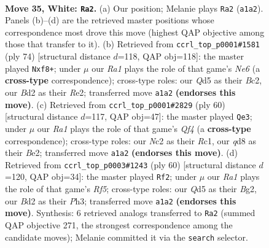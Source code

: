 \documentclass[11pt]{article}
\begin{document}
\clearpage

\begin{figure}[p]\centering
\begin{subfigure}{0.46\textwidth}\centering
\resizebox{\linewidth}{!}{%
\newchessgame
\chessboard[
  setfen={r2q1rk1/3n1p2/3p4/1PpQ3p/p5nP/P5P1/1bNB4/RN3RK1 w - - 0 35},
  showmover=false,
  pgfstyle=straightmove, color=movearrow, markmove={a1-a2}
]}
\caption{}
\end{subfigure}\hfill
\begin{subfigure}{0.46\textwidth}\centering
\resizebox{\linewidth}{!}{%
\newchessgame
\chessboard[
  setfen={4rr2/2p1n2k/1p2Nq1p/p2b1p1Q/P1p5/2P5/2B1R1PK/5R2 w - - 4 38},
  showmover=false,
  pgfstyle=straightmove, color=movearrow, markmove={e6-f8}
]}
\caption{}
\end{subfigure}
\\[4pt]
\begin{subfigure}{0.46\textwidth}\centering
\resizebox{\linewidth}{!}{%
\newchessgame
\chessboard[
  setfen={1qrr2k1/5pp1/2bppnn1/1p6/3RPQ2/P1N2N2/1P2BPP1/2R3K1 w - - 2 31},
  showmover=false,
  pgfstyle=straightmove, color=movearrow, markmove={f4-e3}
]}
\caption{}
\end{subfigure}\hfill
\begin{subfigure}{0.46\textwidth}\centering
\resizebox{\linewidth}{!}{%
\newchessgame
\chessboard[
  setfen={r3rnk1/3q1p2/bp4p1/p2pPR2/3N2P1/1P5P/P2Q2B1/3R2K1 w - - 0 31},
  showmover=false,
  pgfstyle=straightmove, color=movearrow, markmove={f5-f2}
]}
\caption{}
\end{subfigure}
\caption{\textbf{Move 35, White: \texttt{Ra2}.} (a) Our position; Melanie plays \texttt{Ra2} (\texttt{a1a2}). Panels (b)--(d) are the retrieved master positions whose correspondence most drove this move (highest QAP objective among those that transfer to it). (b) Retrieved from \texttt{ccrl\_top\_p0001\#1581} (ply 74) [structural distance $d$=118, QAP obj=118]: the master played \texttt{Nxf8+}; under $\mu$ our \emph{Ra1} plays the role of that game's \emph{Ne6} (a \textbf{cross-type} correspondence); cross-type roles: our \emph{Q}d5 as their \emph{B}c2, our \emph{B}d2 as their \emph{R}e2; transferred move \texttt{a1a2} \textbf{(endorses this move)}. (c) Retrieved from \texttt{ccrl\_top\_p0001\#2829} (ply 60) [structural distance $d$=117, QAP obj=47]: the master played \texttt{Qe3}; under $\mu$ our \emph{Ra1} plays the role of that game's \emph{Qf4} (a \textbf{cross-type} correspondence); cross-type roles: our \emph{N}c2 as their \emph{R}c1, our \emph{q}d8 as their \emph{B}e2; transferred move \texttt{a1a2} \textbf{(endorses this move)}. (d) Retrieved from \texttt{ccrl\_top\_p0003\#1243} (ply 60) [structural distance $d$=120, QAP obj=34]: the master played \texttt{Rf2}; under $\mu$ our \emph{Ra1} plays the role of that game's \emph{Rf5}; cross-type roles: our \emph{Q}d5 as their \emph{B}g2, our \emph{B}d2 as their \emph{P}h3; transferred move \texttt{a1a2} \textbf{(endorses this move)}. Synthesis: 6 retrieved analogs transferred to \texttt{Ra2} (summed QAP objective 271, the strongest correspondence among the candidate moves); Melanie committed it via the \texttt{search} selector.}
\label{fig:thought-m68}
\end{figure}
\end{document}

